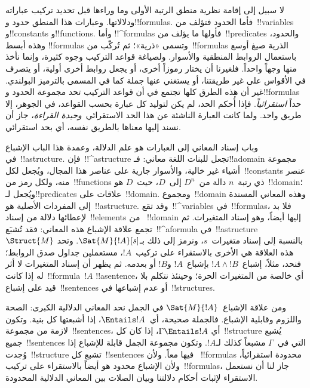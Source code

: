 \documentclass[../../../include/open-logic-section]{subfiles}
\begin{document}


لا سبيل إلى إقامة نظرية منطق الرتبة الأولى وما وراءها قبل تحديد تركيب
عباراته ودلالاتها. وعبارات هذا المنطق حدود و!!{formula}s. فأما الحدود
فتؤلف من~!!{variable}s و!!{constant}s و!!{function}s. وأما
!!^{formula}s فأولها ما يؤلف من~!!{predicate}s والحدود، وهذه أبسط
!!{formula}s وتسمى «ذرية»؛ ثم تُركّب من~!!{formula}s الذرية صيغ أوسع
باستعمال الروابط المنطقية والأسوار. ولصياغة قواعد التركيب وجوه كثيرة،
وإنما نأخذ منها وجهاً واحداً. فلغيرنا أن يختار رموزاً أخرى، أو يجعل
روابط أخرى أولية، أو يتصرف في الأقواس على غير طريقتنا، أو يستغني عنها
جملة كما في المسمى بالترميز البولندي. غير أن هذه الطرق كلها تجتمع في أن
قواعد التركيب تحد مجموعة الحدود و!!{formula}s حداً \emph{استقرائياً}.
فإذا أُحكم الحد، لم يكن لتوليد كل عبارة بحسب القواعد، في الجوهر، إلا طريق
واحد. ولما كانت العبارة الناشئة عن هذا الحد الاستقرائي~\emph{وحيدة
القراءة}، جاز أن نسند إليها معناها بالطريق نفسه، أي بحد استقرائي.

وباب إسناد المعاني إلى العبارات هو علم الدلالة، وعمدة هذا الباب الإشباع
في~!!a{structure}. فإن~!!^a{structure} تجعل للبنات اللغة معاني:
فـ!!a{domain} مجموعة أشياء غير خالية، والأسوار جارية على عناصر هذا
المجال، ويُجعل لكل~!!{constant}s عنصر منه، ولكل رمز من~!!{function}s
ذي رتبة~$n$ دالة من~$D^n$ إلى~$D$، حيث~$D$ هو~!!{domain}؛ ويُجعل
لـ!!{predicate}s علاقات على~!!{domain}. ومجموع~!!{domain} وهذه المعاني
المسندة إلى المفردات الأصلية هو~!!a{structure}. وقد تقع~!!^{variable}s
في~!!{formula}s، فلا بد لإعطائها دلالة من إسناد~!!{element}s من
~!!{domain} إليها أيضاً، وهو إسناد المتغيرات. ثم تجمع علاقة الإشباع هذه
المعاني: فقد تُشبَع~!!^a{formula} في~!!a{structure}~$\Struct{M}$ بالنسبة
إلى إسناد متغيرات~$s$، ونرمز إلى ذلك بـ$\Sat{M}{!A}[s]$. وتحد هذه
العلاقة هي الأخرى بالاستقراء على تركيب~$!A$، مستعملين جداول صدق الروابط؛
فنحد، مثلاً، إشباع~$!A \land !B$ بإشباع~$!A$ و$!B$ أو بعدمه. ثم يظهر أن
إسناد المتغيرات لا أثر له إذا كانت~!!{formula}~$!A$ !!a{sentence}، أي
خالصة من المتغيرات الحرة؛ وحينئذ نتكلم بلا قيد على إشباع~!!{sentence}s
أو عدم إشباعها في~!!{structure}s.

ومن علاقة الإشباع~$\Sat{M}{!A}$ في الجمل نحد المعاني الدلالية الكبرى:
الصحة واللزوم وقابلية الإشباع. فالجملة صحيحة، أي~$\Entails !A$، إذا
أشبعتها كل بنية. وتكون لازمة من مجموعة~!!{sentence}s، أي
$\Gamma \Entails !A$، إذا كان كل~!!{structure} يُشبع جميع~!!{sentence}s
التي في~$\Gamma$ مشبعاً كذلك لـ$!A$. وتكون مجموعة الجمل قابلة للإشباع
إذا وُجدت~!!{structure} تشبع كل~!!{sentence}s فيها معاً. ولأن
~!!{formula}s محدودة استقرائياً، ولأن الإشباع محدود هو أيضاً بالاستقراء
على تركيب~!!{formula}s، جاز لنا أن نستعمل الاستقراء لإثبات أحكام دلالتنا
وبيان الصلات بين المعاني الدلالية المحدودة.
\end{document}
